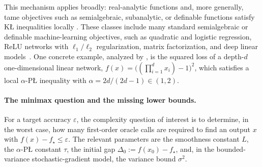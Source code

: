 \documentclass[11pt]{article}
\begin{document}
This mechanism applies broadly: real-analytic functions and, more generally, tame objectives such as semialgebraic,
subanalytic, or definable functions satisfy K\L{} inequalities locally
\citep{Lojasiewicz1963,Kurdyka1998,BolteDaniilidisLewis2007,AttouchBolteRedontSoubeyran2010,LiPong2018}. These classes
include many standard semialgebraic or definable machine-learning objectives, such as quadratic and logistic
regression, ReLU networks with \(\ell_1/\ell_2\) regularization, matrix factorization, and deep linear
models~\citep{BolteDaniilidisLewis2007,AttouchBolteRedontSoubeyran2010,LiuZhuBelkin2022}. One concrete example,
analyzed by \citet{MasihaSalehkaleybarHeKiyavashThiran2026}, is the squared loss of a depth-\(d\) one-dimensional
linear network, \(f(x)=\bigl((\prod_{i=1}^d x_i)-1\bigr)^2\), which satisfies a local \(\alpha\)-P\L{} inequality with
\(\alpha=2d/(2d-1)\in(1,2)\). %

\paragraph{The minimax question and the missing lower bounds.}
For a target accuracy $\varepsilon$, the complexity question of interest is to determine, in the
worst case, how many first-order oracle calls are required to find an output $x$ with \(f(x)-f_\star\le\varepsilon\). The relevant parameters are the smoothness
constant $L$, the $\alpha$-P\L{} constant $\tau$, the initial gap $\Delta_0:=f(x_0)-f_\star$, and, in the
bounded-variance stochastic-gradient model, the variance bound $\sigma^2$.
\end{document}
